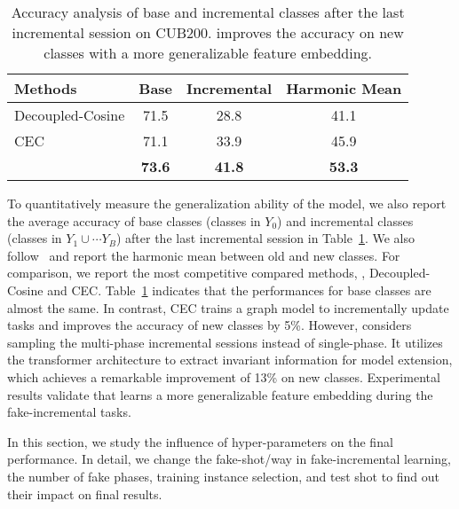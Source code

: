 \begin{table}[t] 
	\caption{Accuracy analysis of base and incremental classes after the last incremental session on CUB200. \name improves the accuracy on new classes with a more generalizable feature embedding. }
	\centering
	{\begin{tabular}{lccc}
			\addlinespace
			\toprule
			{Methods} &{Base}  &{Incremental} &{Harmonic Mean}  \\
			\midrule
			Decoupled-Cosine & 71.5 &  28.8 &41.1\\
			CEC & 71.1 & 33.9 &45.9 \\
			\midrule
			\name & \bf 73.6 & \bf41.8 &\bf 53.3\\
			\bottomrule
		\end{tabular}\label{table:knownandunknown}}
\end{table}

To quantitatively measure the generalization ability of the model, we also report the average accuracy of base classes (classes in $Y_0$) and incremental classes (classes in $Y_1\cup\cdots Y_{B}$) after the last incremental session in Table~\ref{table:knownandunknown}.
We also follow~\cite{Cheraghian_2021_CVPR,ye2021learning} and report the harmonic mean between old and new classes.
 For comparison, we report the most competitive compared methods, \ie, Decoupled-Cosine and CEC. Table~\ref{table:knownandunknown} indicates that the performances for base classes are almost the same.
In contrast, CEC trains a graph model to incrementally update tasks and improves the accuracy of new classes by 5\%. However, \name considers sampling the multi-phase incremental sessions instead of single-phase. It utilizes the transformer architecture to extract invariant information for model extension, which achieves a remarkable improvement of 13\% on new classes.
Experimental results validate that \name learns a more generalizable feature embedding during the fake-incremental tasks.




 \label{sec:hyperparam}
In this section, we study the influence of hyper-parameters on the final performance. 
In detail, we change the fake-shot/way in  fake-incremental learning, the number of fake phases, training instance selection, and test shot to find out their impact on final results.

